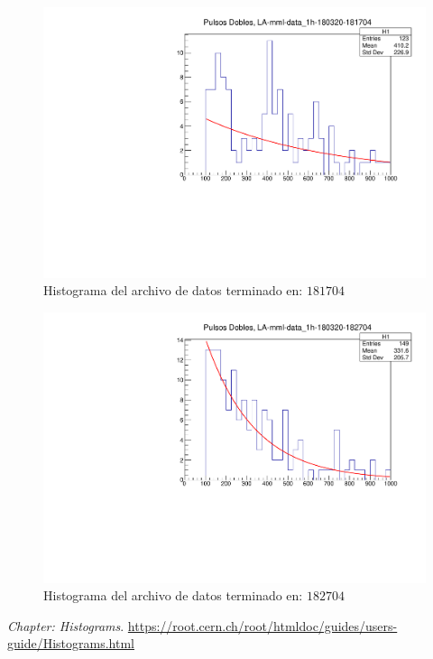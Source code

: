 \documentclass[conference]{IEEEtran}
\begin{document}
         \begin{figure}[H]
            \centering
            \includegraphics[scale=0.4]{./Imagenes/file5.pdf}
            \caption{Histograma del archivo de datos terminado en: $181704$}
            \label{fig:file5}
         \end{figure} 
         \begin{figure}[H]
            \centering
            \includegraphics[scale=0.4]{./Imagenes/file6.pdf}
            \caption{Histograma del archivo de datos terminado en: $182704$}
            \label{fig:file6}
         \end{figure} 
        
        
        
        
\begin{thebibliography}{00}
 \textit{Chapter: Histograms}. \url{https://root.cern.ch/root/htmldoc/guides/users-guide/Histograms.html}
\end{thebibliography}
\end{document}
